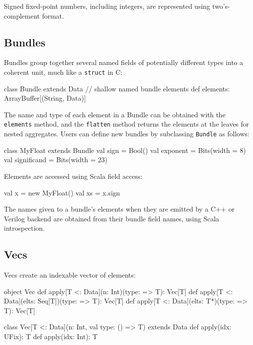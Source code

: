 \documentclass[10pt,twocolumn]{article}
\def\code#1{{\small\tt #1}}
\begin{document}
\noindent
Signed fixed-point
numbers, including integers, are represented using two's-complement
format.  

\subsection{Bundles}

Bundles group together several named fields of potentially different
types into a coherent unit, much like a \code{struct} in C:

\begin{scala}
class Bundle extends Data {
  // shallow named bundle elements
  def elements: ArrayBuffer[(String, Data)]
}
\end{scala}

\noindent
The name and type of each element in a Bundle can be obtained with the
\code{elements} method, and the \code{flatten} method returns the
elements at the leaves for nested aggregates.  Users can define new
bundles by subclassing \code{Bundle} as follows:

\begin{scala}
class MyFloat extends Bundle {
  val sign        = Bool()
  val exponent    = Bits(width = 8)
  val significand = Bits(width = 23)
}
\end{scala}
\noindent
Elements are accessed using Scala field access:

\begin{scala}
val x  = new MyFloat()
val xs = x.sign
\end{scala}

The names given to a bundle's elements when they are emitted by a C++
or Verilog backend are obtained from their bundle field names, using
Scala introspection.

\subsection{Vecs}

Vecs create an indexable vector of elements: 

\begin{scala}
object Vec {
  def apply[T <: Data](n: Int)(type: => T): Vec[T]
  def apply[T <: Data](elts: Seq[T])(type: => T): Vec[T]
  def apply[T <: Data](elts: T*)(type: => T): Vec[T]
}

class Vec[T <: Data](n: Int, val type: () => T) 
    extends Data {
  def apply(idx: UFix): T
  def apply(idx: Int): T
}
\end{scala}
\end{document}
